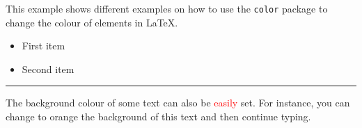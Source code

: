 \documentclass{article}
\begin{document}
This example shows different examples on how to use the \texttt{color} package
to change the colour of elements in \LaTeX.

\begin{itemize}
\color{ForestGreen}
\item First item
\item Second item
\end{itemize}

\noindent
{\color{RubineRed} \rule{\linewidth}{0.5mm} }

The background colour of some text can also be \textcolor{red}{easily} set. For
instance, you can change to orange the background of \colorbox{BurntOrange}{this
text} and then continue typing.
\end{document}
